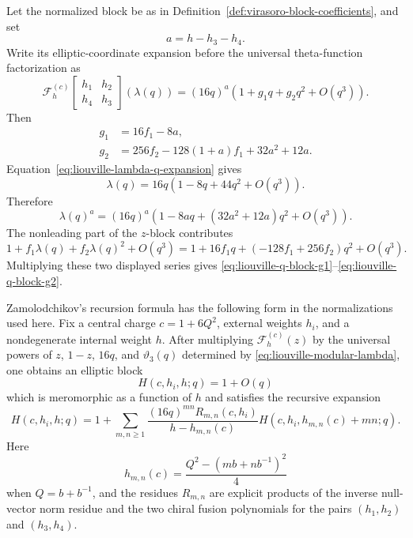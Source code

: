 \begin{remark}
\label{prop:liouville-z-to-q-block-coefficients}
Let the normalized block be as in
Definition~\ref{def:virasoro-block-coefficients}, and set
\[
  a=h-h_3-h_4 .
\]
Write its elliptic-coordinate expansion before the universal theta-function
factorization as
\begin{equation}
  \mathcal F_h^{(c)}
  \!\left[
    \begin{matrix}h_1&h_2\\ h_4&h_3\end{matrix}
  \right]\!(\lambda(q))
  =
  (16q)^a
  \left(1+g_1q+g_2q^2+O(q^3)\right).
  \label{eq:liouville-raw-q-block-expansion}
\end{equation}
Then
\begin{align}
  g_1
  &=
  16f_1-8a,
  \label{eq:liouville-q-block-g1}\\
  g_2
  &=
  256f_2-128(1+a)f_1+32a^2+12a .
  \label{eq:liouville-q-block-g2}
\end{align}
Equation~\eqref{eq:liouville-lambda-q-expansion} gives
\[
  \lambda(q)=16q(1-8q+44q^2+O(q^3)).
\]
Therefore
\[
  \lambda(q)^a
  =
  (16q)^a
  \left(
    1-8aq+(32a^2+12a)q^2+O(q^3)
  \right).
\]
The nonleading part of the \(z\)-block contributes
\[
  1+f_1\lambda(q)+f_2\lambda(q)^2+O(q^3)
  =
  1+16f_1q+(-128f_1+256f_2)q^2+O(q^3).
\]
Multiplying these two displayed series gives
\eqref{eq:liouville-q-block-g1}--\eqref{eq:liouville-q-block-g2}.
\end{remark}

\begin{quotedtheorem}
\label{qthm:zamolodchikov-elliptic-recursion}
Zamolodchikov's recursion formula
\cite{Zamolodchikov1984,Zamolodchikov1987} has the following form in the
normalizations used here.  Fix a central charge \(c=1+6Q^2\), external weights
\(h_i\), and a nondegenerate
internal weight \(h\).  After multiplying
\(\mathcal F_h^{(c)}(z)\) by the universal powers of \(z\), \(1-z\), \(16q\),
and \(\vartheta_3(q)\) determined by \eqref{eq:liouville-modular-lambda}, one
obtains an elliptic block
\[
  H(c,h_i,h;q)=1+O(q)
\]
which is meromorphic as a function of \(h\) and satisfies the recursive
expansion
\begin{equation}
  H(c,h_i,h;q)
  =
  1+
  \sum_{m,n\ge1}
  \frac{(16q)^{mn}R_{m,n}(c,h_i)}
       {h-h_{m,n}(c)}
  H(c,h_i,h_{m,n}(c)+mn;q).
  \label{eq:zamolodchikov-elliptic-recursion}
\end{equation}
Here
\[
  h_{m,n}(c)
  =
  \frac{Q^2-(mb+n b^{-1})^2}{4}
\]
when \(Q=b+b^{-1}\), and the residues \(R_{m,n}\) are explicit products of
the inverse null-vector norm residue and the two chiral fusion polynomials for
the pairs \((h_1,h_2)\) and \((h_3,h_4)\).
\end{quotedtheorem}

